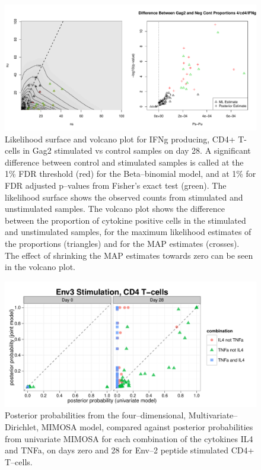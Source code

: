 \documentclass[11pt]{article}
\begin{document}
\begin{figure}[htbp] %
   \centering
   \includegraphics[width=6in]{Figures/HVTN054LikelihoodAndVolcanoplots} 
   \caption{Likelihood surface and volcano plot for IFNg producing, CD4+ T-cells in Gag2 stimulated vs control samples on day 28. A significant difference between control and stimulated samples is called at the 1\% FDR threshold (red) for the Beta--binomial model, and at 1\% for FDR adjusted p--values from Fisher's exact test (green). The likelihood surface shows the observed counts from stimulated and unstimulated samples. The volcano plot shows the difference between the proportion of cytokine positive cells in the stimulated and unstimulated samples, for the maximum likelihood estimates of the proportions (triangles) and for the MAP estimates (crosses). The effect of shrinking the MAP estimates towards zero can be seen in the volcano plot.}
   \label{fig:icsdata}
\end{figure}

\begin{figure}[htbp] %
   \centering
   \includegraphics[width=6in]{Figures/Polyfunctionality_ggplot2} 
   \caption{Posterior probabilities from the four--dimensional, Multivariate--Dirichlet, MIMOSA model, compared against posterior probabilities from univariate MIMOSA for each combination of the cytokines IL4 and TNFa, on days zero and 28 for Env--2 peptide stimulated CD4+ T--cells.}
   \label{fig:polyfunctionality}
\end{figure}
\end{document}
